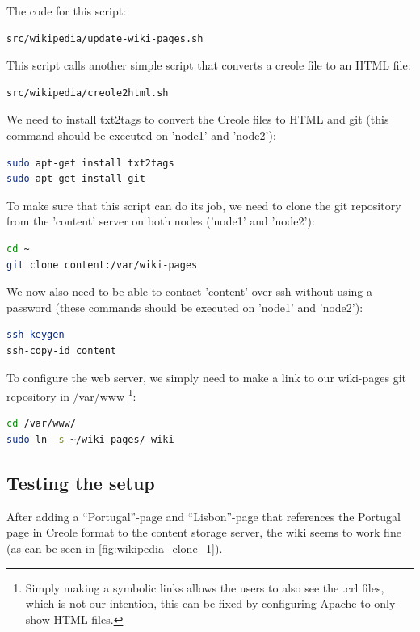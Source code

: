 \documentclass[12pt]{report}
\begin{document}
The code for this script:
 \begin{lstlisting}[language=bash]
src/wikipedia/update-wiki-pages.sh
\end{lstlisting}
This script calls another simple script that converts a creole file to
an HTML file:
 \begin{lstlisting}[language=bash]
src/wikipedia/creole2html.sh
\end{lstlisting}

We need to install txt2tags to convert the Creole files to HTML and git (this
command should be executed on 'node1' and 'node2'):
\begin{lstlisting}[language=bash]
sudo apt-get install txt2tags
sudo apt-get install git
\end{lstlisting}

To make sure that this script can do its job, we need to clone the git
repository from the 'content' server on both nodes ('node1' and 'node2'):
 \begin{lstlisting}[language=bash]
cd ~
git clone content:/var/wiki-pages
\end{lstlisting}
We now also need to be able to contact 'content' over ssh without using
a password (these commands should be executed on 'node1' and 'node2'):
\begin{lstlisting}[language=bash]
ssh-keygen
ssh-copy-id content
\end{lstlisting}

To configure the web server, we simply need to make a link to our
wiki-pages git repository in /var/www \footnote{Simply making a
  symbolic links allows the users to also see the .crl files, which is
  not our intention, this can be fixed by configuring Apache to only
  show HTML files.}:
\begin{lstlisting}[language=bash]
cd /var/www/
sudo ln -s ~/wiki-pages/ wiki
\end{lstlisting}

\subsection{Testing the setup}
After adding a ``Portugal''-page and ``Lisbon''-page that references
the Portugal page in Creole format to the content storage server, the
wiki seems to work fine (as can be seen in \cref{fig:wikipedia_clone_1}).
\end{document}
